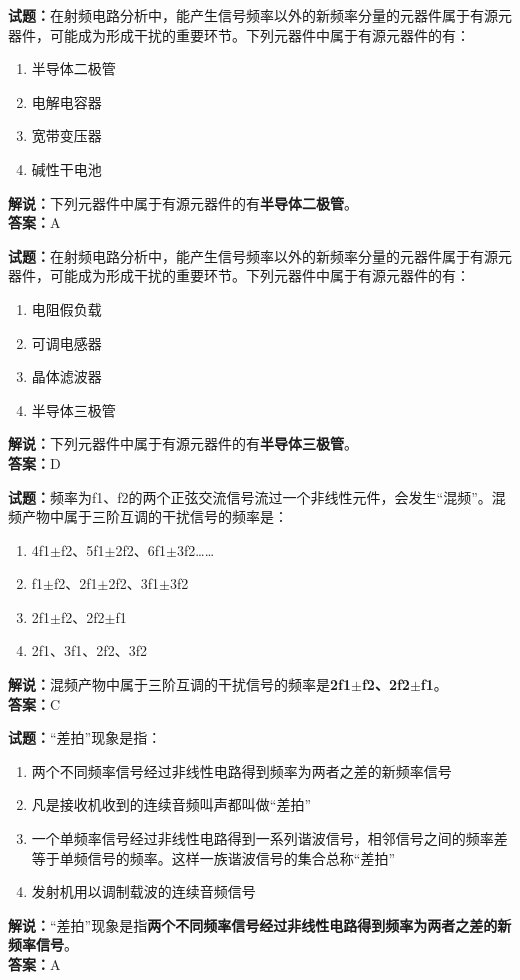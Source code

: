\documentclass{ctexbook}
\begin{document}
\bigskip


\noindent\textbf{试题：}在射频电路分析中，能产生信号频率以外的新频率分量的元器件属于有源元器件，可能成为形成干扰的重要环节。下列元器件中属于有源元器件的有：
\begin{enumerate}[leftmargin=3em]
\item 半导体二极管
\item 电解电容器
\item 宽带变压器
\item 碱性干电池
\end{enumerate}
\noindent\textbf{解说：}下列元器件中属于有源元器件的有\textbf{半导体二极管}。\\\noindent\textbf{答案：}A



\bigskip


\noindent\textbf{试题：}在射频电路分析中，能产生信号频率以外的新频率分量的元器件属于有源元器件，可能成为形成干扰的重要环节。下列元器件中属于有源元器件的有：
\begin{enumerate}[leftmargin=3em]
\item 电阻假负载
\item 可调电感器
\item 晶体滤波器
\item 半导体三极管
\end{enumerate}
\noindent\textbf{解说：}下列元器件中属于有源元器件的有\textbf{半导体三极管}。\\\noindent\textbf{答案：}D



\bigskip


\noindent\textbf{试题：}频率为f1、f2的两个正弦交流信号流过一个非线性元件，会发生“混频”。混频产物中属于三阶互调的干扰信号的频率是：
\begin{enumerate}[leftmargin=3em]
\item 4f1$\pm$f2、5f1$\pm$2f2、6f1$\pm$3f2……
\item f1$\pm$f2、2f1$\pm$2f2、3f1$\pm$3f2
\item 2f1$\pm$f2、2f2$\pm$f1
\item 2f1、3f1、2f2、3f2
\end{enumerate}
\noindent\textbf{解说：}混频产物中属于三阶互调的干扰信号的频率是\textbf{2f1$\pm$f2、2f2$\pm$f1}。\\\noindent\textbf{答案：}C


\bigskip


\noindent\textbf{试题：}“差拍”现象是指：
\begin{enumerate}[leftmargin=3em]
\item 两个不同频率信号经过非线性电路得到频率为两者之差的新频率信号
\item 凡是接收机收到的连续音频叫声都叫做“差拍”
\item 一个单频率信号经过非线性电路得到一系列谐波信号，相邻信号之间的频率差等于单频信号的频率。这样一族谐波信号的集合总称“差拍”
\item 发射机用以调制载波的连续音频信号
\end{enumerate}
\noindent\textbf{解说：}“差拍”现象是指\textbf{两个不同频率信号经过非线性电路得到频率为两者之差的新频率信号}。\\\noindent\textbf{答案：}A
\end{document}
